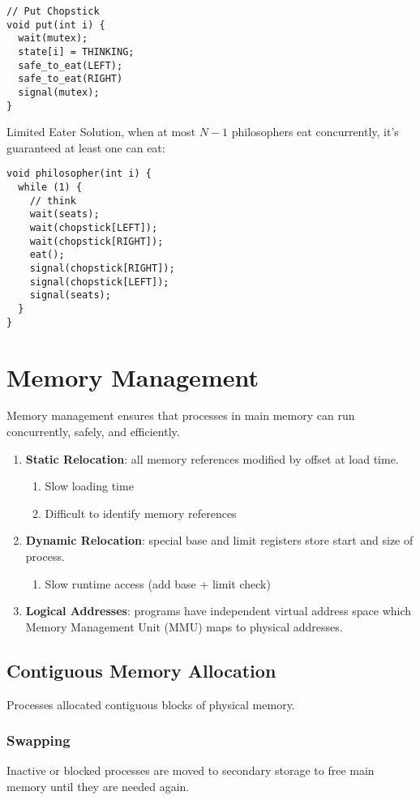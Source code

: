 \documentclass[12pt, a4paper]{article}
\begin{document}
\begin{multicols*}{3}
\begin{minipage}{0.45\columnwidth}
\begin{lstlisting}
// Put Chopstick
void put(int i) {
  wait(mutex);
  state[i] = THINKING;
  safe_to_eat(LEFT);
  safe_to_eat(RIGHT)
  signal(mutex);
}
  \end{lstlisting}
  \vfill
\end{minipage}
Limited Eater Solution, when at most $N-1$ philosophers eat concurrently, it's guaranteed at least one can eat:
\begin{lstlisting}
void philosopher(int i) {
  while (1) {
    // think 
    wait(seats);
    wait(chopstick[LEFT]);
    wait(chopstick[RIGHT]);
    eat();
    signal(chopstick[RIGHT]);
    signal(chopstick[LEFT]);
    signal(seats);
  }
}
\end{lstlisting}
\section{Memory Management}
Memory management ensures that processes in main memory can run concurrently, safely, and efficiently.
\begin{enumerate}[\roman*.]
  \item \textbf{Static Relocation}: all memory references modified by offset at load time. 
    \begin{enumerate}[$-$]
      \item Slow loading time
      \item Difficult to identify memory references
    \end{enumerate}
  \item \textbf{Dynamic Relocation}: special base and limit registers store start and size of process.
    \begin{enumerate}[$-$]
      \item Slow runtime access (add base + limit check)
    \end{enumerate}
  \item \textbf{Logical Addresses}: programs have independent virtual address space which Memory Management Unit (MMU) maps to physical addresses.
\end{enumerate}

\subsection{Contiguous Memory Allocation}
Processes allocated contiguous blocks of physical memory. 
\subsubsection{Swapping}
Inactive or blocked processes are moved to secondary storage to free main memory until they are needed again.


\end{multicols*}
\end{document}
